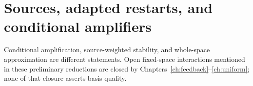 \documentclass[11pt,oneside,openany,a4paper]{book}
\numberwithin{equation}{chapter}
\theoremstyle{definition}
\theoremstyle{remark}
\newcommand{\proofstep}[1]{\par\addvspace{.45\baselineskip}\Needspace{3\baselineskip}\textbf{#1}\par\nobreak}
\newcommand{\R}{\mathbb R}\newcommand{\E}{\mathbb E}\newcommand{\Prb}{\mathbb P}\newcommand{\PP}{\mathbb P}
\newcommand{\T}{\mathsf T}\newcommand{\Id}{I}
\newcommand{\F}[1]{\left\lVert#1\right\rVert_F}
\newcommand{\N}[1]{\left\lVert#1\right\rVert}
\newcommand{\op}[1]{\left\lVert#1\right\rVert_{\rm op}}
\newcommand{\ip}[2]{\left\langle#1,#2\right\rangle_F}
\DeclareMathOperator{\tr}{tr}\DeclareMathOperator{\rank}{rank}
\DeclareMathOperator{\diag}{blockdiag}\DeclareMathOperator{\range}{range}
\DeclareMathOperator{\HSS}{HSS}\DeclareMathOperator{\dist}{dist}
\DeclareMathOperator{\Var}{Var}\DeclareMathOperator{\supp}{supp}
\newcommand{\UC}{\mathcal U}\newcommand{\VC}{\mathcal V}\newcommand{\err}{\mathcal E}
\newcommand{\Sn}[2]{\left\lVert#1\right\rVert_{S_{#2}}}
\newcommand{\Cov}{\mathsf C}\newcommand{\Loss}{\mathsf L}\newcommand{\Fil}{\mathcal F}
\DeclareMathOperator{\diver}{div}\DeclareMathOperator{\vecop}{vec}\DeclareMathOperator{\Gammafun}{Gamma}
\begin{document}
\endgroup

\begingroup
\let\R\relax
\newcommand{\R}{\mathbb R}
\let\E\relax
\newcommand{\E}{\mathbb E}
\let\Prb\relax
\newcommand{\Prb}{\mathbb P}
\let\T\relax
\newcommand{\T}{\mathsf T}
\let\F\relax
\newcommand{\F}[1]{\left\lVert#1\right\rVert_{F}}
\let\N\relax
\newcommand{\N}[1]{\left\lVert#1\right\rVert}
\let\ip\relax
\newcommand{\ip}[2]{\left\langle#1,#2\right\rangle_F}
\let\tr\relax
\newcommand{\tr}{\operatorname{tr}}
\let\rank\relax
\newcommand{\rank}{\operatorname{rank}}
\let\diag\relax
\newcommand{\diag}{\operatorname{blockdiag}}
\let\range\relax
\newcommand{\range}{\operatorname{range}}
\let\OPT\relax
\newcommand{\OPT}{\operatorname{OPT}}
\let\HSS\relax
\newcommand{\HSS}{\operatorname{HSS}}
\let\diver\relax
\newcommand{\diver}{\operatorname{div}}
\let\Var\relax
\newcommand{\Var}{\operatorname{Var}}
\let\UC\relax
\newcommand{\UC}{\mathcal U}
\let\VC\relax
\newcommand{\VC}{\mathcal V}
\let\err\relax
\newcommand{\err}{\mathcal E}
\let\proofstep\relax
\newcommand{\proofstep}[1]{\par\addvspace{.45\baselineskip}\Needspace{3\baselineskip}\textbf{#1}\par\nobreak}
\let\op\relax
\newcommand{\op}[1]{\left\lVert#1\right\rVert_{\mathrm{op}}}
\let\Sn\relax
\newcommand{\Sn}[2]{\left\lVert#1\right\rVert_{S_{#2}}}
\let\Cov\relax
\newcommand{\Cov}{\mathsf C}
\let\Loss\relax
\newcommand{\Loss}{\mathsf L}
\let\Fil\relax
\newcommand{\Fil}{\mathcal F}
\let\Id\relax
\newcommand{\Id}{I}
\let\supp\relax
\newcommand{\supp}{\operatorname{supp}}
\let\vecop\relax
\newcommand{\vecop}{\operatorname{vec}}
\let\Gammafun\relax
\newcommand{\Gammafun}{\operatorname{Gamma}}
\chapter{Sources, adapted restarts, and conditional amplifiers}\label{ch:sources}
\begin{scopebox}
Conditional amplification, source-weighted stability, and whole-space approximation are different statements. Open fixed-space interactions mentioned in these preliminary reductions are closed by Chapters~\ref{ch:feedback}--\ref{ch:uniform}; none of that closure asserts basis quality.
\end{scopebox}
\end{document}
